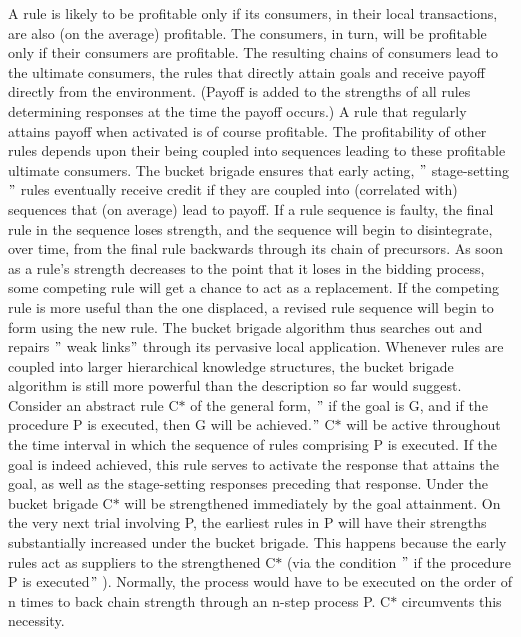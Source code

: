 \documentclass[12pt]{article}
\renewcommand{\_}{\kern-1.5pt\textunderscore\kern-1.5pt}
\begin{document}
\vspace{\baselineskip}
A rule is likely to be profitable only if its consumers, in their local transactions, are also (on the average) profitable. The consumers, in turn, will be profitable only if their consumers are profitable. The resulting chains of consumers lead to the ultimate consumers, the rules that directly attain goals and receive payoff directly from the environment. (Payoff is added to the strengths of all rules determining responses at the time the payoff occurs.) A rule that regularly attains payoff when activated is of course profitable. The profitability of other rules depends upon their being coupled into sequences leading to these profitable ultimate consumers. The bucket brigade ensures that early acting, $"$ stage-setting$"$  rules eventually receive credit if they are coupled into (correlated with) sequences that (on average) lead to payoff. If a rule sequence is faulty, the final rule in the sequence loses strength, and the sequence will begin to disintegrate, over time, from the final rule backwards through its chain of precursors. As soon as a rule’s strength decreases to the point that it loses in the bidding process, some competing rule will get a chance to act as a replacement. If the competing rule is more useful than the one displaced, a revised rule sequence will begin to form using the new rule. The bucket brigade algorithm thus searches out and repairs $"$ weak links$"$  through its pervasive local application. Whenever rules are coupled into larger hierarchical knowledge structures, the bucket brigade algorithm is still more powerful than the description so far would suggest. Consider an abstract rule C$\ast$  of the general form, $"$ if the goal is G, and if the procedure P is executed, then G will be achieved.$"$  C$\ast$  will be active throughout the time interval in which the sequence of rules comprising P is executed. If the goal is indeed achieved, this rule serves to activate the response that attains the goal, as well as the stage-setting responses preceding that response. Under the bucket brigade C$\ast$  will be strengthened immediately by the goal attainment. On the very next trial involving P, the earliest rules in P will have their strengths substantially increased under the bucket brigade. This happens because the early rules act as suppliers to the strengthened C$\ast$  (via the condition $"$ if the procedure P is executed$"$ ). Normally, the process would have to be executed on the order of n times to back chain strength through an n-step process P. C$\ast$  circumvents this necessity.\par
\end{document}
